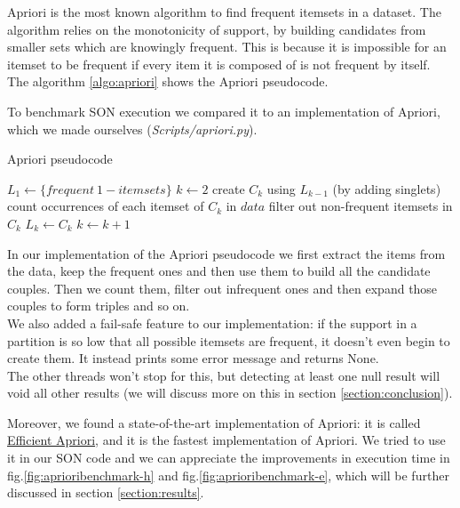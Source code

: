 \documentclass[a4paper]{article}
\begin{document}
	Apriori is the most known algorithm to find frequent itemsets in a dataset. The algorithm relies on the monotonicity of support, by building candidates from smaller sets which are knowingly frequent. 
	This is because it is impossible for an itemset to be frequent if every item it is composed of is not frequent by itself. The algorithm \ref{algo:apriori} shows the Apriori pseudocode.
	
	To benchmark SON execution we compared it to an implementation of Apriori, which we made ourselves (\textit{Scripts/apriori.py}).
	
\begin{algorithm}
\caption{Apriori pseudocode}
\label{algo:apriori}
\begin{algorithmic}[1]
	\State $L_1 \gets \{frequent \ 1-itemsets\}$ 
    	\State $k \gets 2$
    		\State create $C_k$ using $L_{k-1}$ (by adding singlets) 
    		\State count occurrences of each itemset of $C_k$ in $data$
    		\State filter out non-frequent itemsets in $C_k$
    		\State $L_k \gets C_k$
    		\State $k \gets k+1$
    	\EndWhile
\EndFunction
\end{algorithmic}
\end{algorithm}

    In our implementation of the Apriori pseudocode we first extract the items from the data, keep the frequent ones and then use them to build all the candidate couples.
	Then we count them, filter out infrequent ones and then expand those couples to form triples and so on.\\
    We also added a fail-safe feature to our implementation: if the support in a partition is so low that all possible itemsets are frequent, it doesn't even begin to create them. It instead prints 
	some error message and returns None.\\
	The other threads won't stop for this, but detecting at least one null result will void all other results (we will discuss more on this in section \ref{section:conclusion}).

    Moreover, we found a state-of-the-art implementation of Apriori: it is called \href{https://github.com/tommyod/Efficient-Apriori}{Efficient Apriori}, and it is the fastest implementation of Apriori. 
	We tried to use it in our SON code and we can appreciate the improvements in execution time in fig.\ref{fig:aprioribenchmark-h} and fig.\ref{fig:aprioribenchmark-e}, which will be further discussed in section \ref{section:results}. 
	
\end{document}
